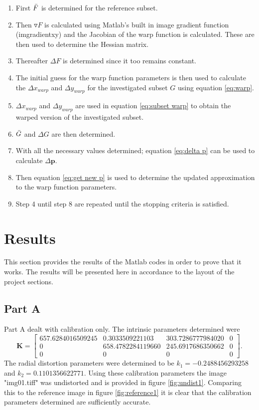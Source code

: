 \documentclass[[12pt,oneside,openany,a4paper, %
\newcommand*\mean[1]{\bar{#1}} %
\begin{document}
\begin{enumerate}
  \item First $\mean{F}$ is determined for the reference subset.
  \item Then $\triangledown F$ is calculated using Matlab's built in image gradient function (imgradientxy) and the Jacobian of the warp function is calculated. These are then used to determine the Hessian matrix.
  \item Thereafter $\Delta F$ is determined since it too remains constant.
  \item The initial guess for the warp function parameters is then used to calculate the $\Delta x_{warp}$ and $\Delta y_{warp}$ for the investigated subset $G$ using equation \ref{eq:warp}.
  \item $\Delta x_{warp}$ and $\Delta y_{warp}$ are used in equation \ref{eq:subset warp} to obtain the warped version of the investigated subset.
  \item $\mean{G}$ and $\Delta G$ are then determined.
  \item With all the necessary values determined; equation \ref{eq:delta p} can be used to calculate $\Delta \bm{p}$.
  \item Then equation \ref{eq:get new p} is used to determine the updated approximation to the warp function parameters.
  \item Step 4 until step 8 are repeated until the stopping criteria is satisfied.
\end{enumerate}


\chapter{Results}
This section provides the results of the Matlab codes in order to prove that it works. The results will be presented here in accordance to the layout of the project sections.

\section{Part A}
Part A dealt with calibration only. The intrinsic parameters determined were
\begin{equation}
  \bm{K} = \begin{bmatrix}
  657.6284016509245 & 0.3033509221103 & 303.7286777984020 & 0\\
  0 & 658.4782284119660 & 245.6917686350662 & 0\\
  0 & 0 & 0 & 0
  \end{bmatrix}.
\end{equation}
The radial distortion parameters were determined to be $k_1 = -0.2488456293258$ and $k_2 = 0.1101356622771$. Using these calibration parameters the image "img01.tiff" was undistorted and is provided in figure \ref{fig:undist1}. Comparing this to the reference image in figure \ref{fig:reference1} it is clear that the calibration parameters determined are sufficiently accurate.
\end{document}
